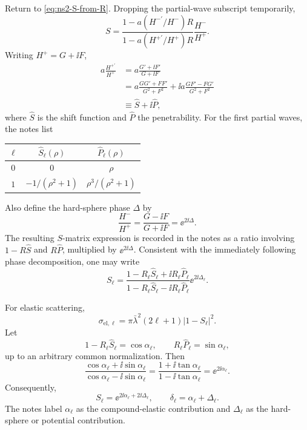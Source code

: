 Return to \eqref{eq:ns2-S-from-R}.  Dropping the partial-wave subscript temporarily,
\[
  S
  =\frac{1-a(H^{-\prime}/H^-)R}{1-a(H^{+\prime}/H^+)R}
  \frac{H^-}{H^+}.
\]
Writing $H^+=G+\ii F$,
\begin{align*}
  a\frac{H^{+\prime}}{H^+}
  &=a\frac{G'+\ii F'}{G+\ii F}\\
  &=a\frac{GG'+FF'}{G^2+F^2}
  +\ii a\frac{GF'-FG'}{G^2+F^2}\\
  &\equiv \widehat S+\ii\widehat P,
\end{align*}
where $\widehat S$ is the shift function and $\widehat P$ the penetrability.  For the first partial waves, the notes list
\begin{center}
\begin{tabular}{c c c}
\toprule
$\ell$ & $\widehat S_\ell(\rho)$ & $\widehat P_\ell(\rho)$\\
\midrule
$0$ & $0$ & $\rho$\\
$1$ & $-1/(\rho^2+1)$ & $\rho^3/(\rho^2+1)$\\
\bottomrule
\end{tabular}
\end{center}
Also define the hard-sphere phase $\Delta$ by
\[
  \frac{H^-}{H^+}=\frac{G-\ii F}{G+\ii F}=\ee^{2\ii\Delta}.
\]
The resulting $S$-matrix expression is recorded in the notes as a ratio involving $1-R\widehat S$ and $R\widehat P$, multiplied by $\ee^{2\ii\Delta}$.  Consistent with the immediately following phase decomposition, one may write
\begin{equation}
  S_\ell
  =\frac{1-R_\ell\widehat S_\ell+\ii R_\ell\widehat P_\ell}
  {1-R_\ell\widehat S_\ell-\ii R_\ell\widehat P_\ell}
  \ee^{2\ii\Delta_\ell}.
  \label{eq:ns2-S-shift-penetration}
\end{equation}

For elastic scattering,
\[
  \sigma_{\mathrm{el},\ell}
  =\pi\bar\lambda^2(2\ell+1)|1-S_\ell|^2.
\]
Let
\[
  1-R_\ell\widehat S_\ell=\cos\alpha_\ell,
  \qquad
  R_\ell\widehat P_\ell=\sin\alpha_\ell,
\]
up to an arbitrary common normalization.  Then
\[
  \frac{\cos\alpha_\ell+\ii\sin\alpha_\ell}
  {\cos\alpha_\ell-\ii\sin\alpha_\ell}
  =\frac{1+\ii\tan\alpha_\ell}{1-\ii\tan\alpha_\ell}
  =\ee^{2\ii\alpha_\ell}.
\]
Consequently,
\begin{equation}
  S_\ell=\ee^{2\ii\alpha_\ell+2\ii\Delta_\ell},
  \qquad
  \delta_\ell=\alpha_\ell+\Delta_\ell.
  \label{eq:ns2-compound-hard-sphere-phase}
\end{equation}
The notes label $\alpha_\ell$ as the compound-elastic contribution and $\Delta_\ell$ as the hard-sphere or potential contribution.

